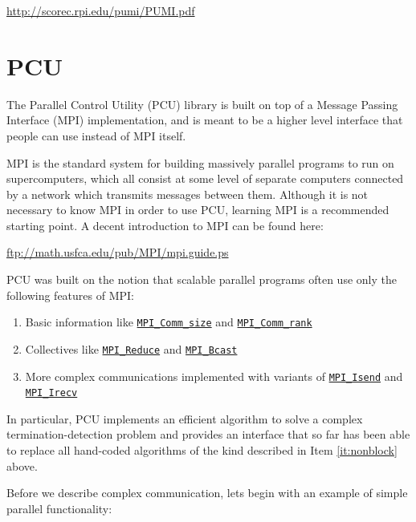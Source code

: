 \documentclass{article}
\begin{document}
\url{http://scorec.rpi.edu/pumi/PUMI.pdf}
\section{PCU}
\label{sec:pcu}

The Parallel Control Utility (PCU) library is built
on top of a Message Passing Interface (MPI) implementation,
and is meant to be a higher level interface that people
can use instead of MPI itself.

MPI is the standard system for building massively parallel
programs to run on supercomputers, which all consist
at some level of separate computers connected by a
network which transmits messages between them.
Although it is not necessary to know MPI in order to use
PCU, learning MPI is a recommended starting point.
A decent introduction to MPI can be found here:

\url{ftp://math.usfca.edu/pub/MPI/mpi.guide.ps}

PCU was built on the notion that scalable parallel
programs often use only the following features of MPI:

\begin{enumerate}
\item Basic information like
\href{http://www.mpich.org/static/docs/v3.1/www3/MPI_Comm_size.html}{\texttt{MPI\_Comm\_size}}
and
\href{http://www.mpich.org/static/docs/v3.1/www3/MPI_Comm_rank.html}{\texttt{MPI\_Comm\_rank}}
\item Collectives like
\href{http://www.mpich.org/static/docs/v3.1/www3/MPI_Reduce.html}{\texttt{MPI\_Reduce}}
and
\href{http://www.mpich.org/static/docs/v3.1/www3/MPI_Bcast.html}{\texttt{MPI\_Bcast}}
\item \label{it:nonblock} More complex communications implemented with variants of
\href{http://www.mpich.org/static/docs/v3.1/www3/MPI_Isend.html}{\texttt{MPI\_Isend}}
and
\href{http://www.mpich.org/static/docs/v3.1/www3/MPI_Irecv.html}{\texttt{MPI\_Irecv}}
\end{enumerate}

In particular, PCU implements an efficient algorithm to solve a complex
termination-detection problem and provides an interface that
so far has been able to replace all hand-coded algorithms
of the kind described in Item \ref{it:nonblock} above.

Before we describe complex communication, lets begin with an example
of simple parallel functionality:


\end{document}
